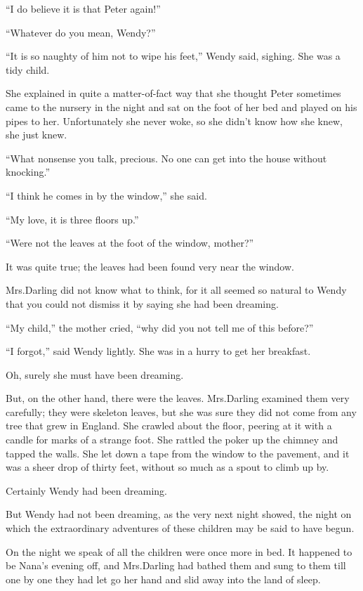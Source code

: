 “I do believe it is that Peter again!”

“Whatever do you mean, Wendy?”

“It is so naughty of him not to wipe his feet,” Wendy said, sighing.
She was a tidy child.

She explained in quite a matter-of-fact way
that she thought Peter sometimes came to the nursery in the night
and sat on the foot of her bed and played on his pipes to her.
Unfortunately she never woke, so she didn’t know how she knew, she just knew.

“What nonsense you talk, precious.
No one can get into the house without knocking.”

“I think he comes in by the window,” she said.

“My love, it is three floors up.”

“Were not the leaves at the foot of the window, mother?”

It was quite true;
the leaves had been found very near the window.

Mrs.\@ Darling did not know what to think,
for it all seemed so natural to Wendy that you could not dismiss it by saying she had been dreaming.

“My child,” the mother cried, “why did you not tell me of this before?”

“I forgot,” said Wendy lightly.
She was in a hurry to get her breakfast.

Oh, surely she must have been dreaming.

But, on the other hand, there were the leaves.
Mrs.\@ Darling examined them very carefully;
they were skeleton leaves, but she was sure they did not come from any tree that grew in England.
She crawled about the floor, peering at it with a candle for marks of a strange foot.
She rattled the poker up the chimney and tapped the walls.
She let down a tape from the window to the pavement,
and it was a sheer drop of thirty feet, without so much as a spout to climb up by.

Certainly Wendy had been dreaming.

But Wendy had not been dreaming,
as the very next night showed,
the night on which the extraordinary adventures of these children may be said to have begun.

On the night we speak of all the children were once more in bed.
It happened to be Nana’s evening off,
and Mrs.\@ Darling had bathed them and sung to them till
one by one they had let go her hand and slid away into the land of sleep.

